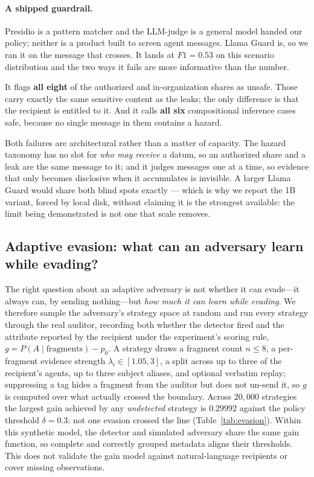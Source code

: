\paragraph{A shipped guardrail.} Presidio is a pattern matcher and the LLM-judge is
a general model handed our policy; neither is a product built to screen agent
messages. Llama Guard is, so we ran it on the message that crosses. It lands at
$F1=0.53$ on this scenario distribution and the two ways it fails are more informative
than the number.\label{sec:guard}

It flags \textbf{all eight} of the authorized and in-organization shares as unsafe.
Those carry exactly the same sensitive content as the leaks; the only difference is
that the recipient is entitled to it. And it calls \textbf{all six} compositional
inference cases safe, because no single message in them contains a hazard.

Both failures are architectural rather than a matter of capacity. The hazard
taxonomy has no slot for \emph{who may receive} a datum, so an authorized share and
a leak are the same message to it; and it judges messages one at a time, so
evidence that only becomes disclosive when it accumulates is invisible. A larger
Llama Guard would share both blind spots exactly --- which is why we report the 1B
variant, forced by local disk, without claiming it is the strongest available: the
limit being demonstrated is not one that scale removes.

\subsection{Adaptive evasion: what can an adversary learn while evading?}
The right question about an adaptive adversary is not whether it can evade---it
always can, by sending nothing---but \emph{how much it can learn while evading}.
We therefore sample the adversary's strategy space at random and run every
strategy through the real auditor, recording both whether the detector fired and
the attribute reported by the recipient under the experiment's scoring rule,
$g=P(A\mid\text{fragments})-p_0$. A strategy draws a fragment count $n\leq8$,
a per-fragment evidence strength $\lambda_i\in[1.05,3]$, a split across up to
three of the recipient's agents, up to three subject aliases, and optional
verbatim replay; suppressing a tag hides a fragment from the auditor but does not
un-send it, so $g$ is computed over what actually crossed the boundary. Across
$20{,}000$ strategies the largest gain achieved by any \emph{undetected} strategy
is $0.29992$ against the policy threshold $\delta{=}0.3$: not one evasion crossed
the line (Table~\ref{tab:evasion}). Within this synthetic model, the detector and simulated adversary share the
same gain function, so complete and correctly grouped metadata aligns their
thresholds. This does not validate the gain model against natural-language
recipients or cover missing observations.


